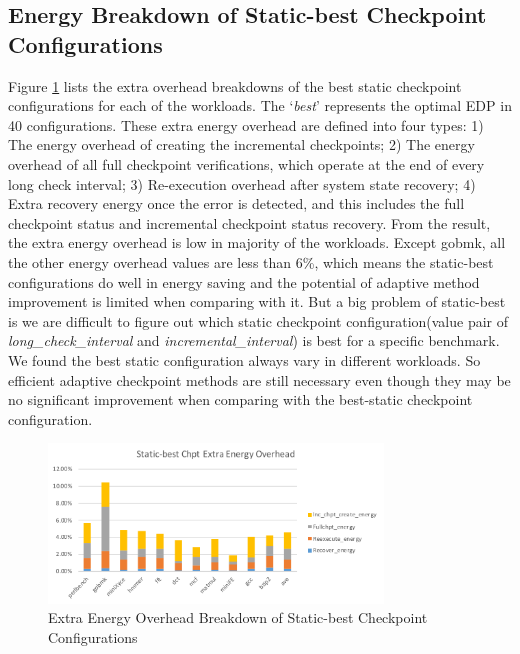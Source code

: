 \documentclass{sig-alternate}
\begin{document}
\subsection{Energy Breakdown of Static-best Checkpoint Configurations}
Figure \ref{fig_Energybreakdown} lists the extra overhead breakdowns of the best static checkpoint configurations for each of the workloads. The `\textit{best}' represents the optimal EDP in 40 configurations. These extra energy overhead are defined into four types: 1) The energy overhead of creating the incremental checkpoints; 2) The energy overhead of all full checkpoint verifications, which operate at the end of every long check interval; 3) Re-execution overhead after system state recovery; 4) Extra recovery energy once the error is detected, and this includes the full checkpoint status and incremental checkpoint status recovery. From the result, the extra energy overhead is low in majority of the workloads. Except gobmk, all the other energy overhead values are less than 6\%, which means the static-best configurations do well in energy saving and the potential of adaptive method improvement is limited when comparing with it. But a big problem of static-best is we are difficult to figure out which static checkpoint configuration(value pair of  \textit{long\_check\_interval} and \textit{incremental\_interval}) is best for a specific benchmark. We found the best static configuration always vary in different workloads. So efficient adaptive checkpoint methods are still necessary even though they may be no significant improvement when comparing with the best-static checkpoint configuration. 

\begin{figure}[H]
\centering
\includegraphics[width=3.5in]{graphics/Energybreakdown.pdf}

\caption{Extra Energy Overhead Breakdown of Static-best Checkpoint Configurations}
\label{fig_Energybreakdown}
\end{figure}
\end{document}
